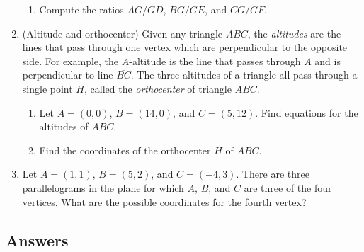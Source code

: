 \begin{enumerate}[resume]
\begin{enumerate}
\item Compute the ratios $AG/GD$, $BG/GE$, and $CG/GF$.
\end{enumerate}
\item (Altitude and orthocenter) Given any triangle $ABC$, the \emph{altitudes} are the lines that pass through one vertex which are perpendicular to the opposite side. For example, the $A$-altitude is the line that passes through $A$ and is perpendicular to line $\overline{BC}$. The three altitudes of a triangle all pass through a single point $H$, called the \emph{orthocenter} of triangle $ABC$.
\begin{enumerate}
\item Let $A = (0,0)$, $B = (14,0)$, and $C = (5,12)$. Find equations for the altitudes of $ABC$.
\item Find the coordinates of the orthocenter $H$ of $ABC$.
\end{enumerate}
\item Let $A = (1,1)$, $B = (5,2)$, and $C = (-4,3)$. There are three parallelograms in the plane for which $A$, $B$, and $C$ are three of the four vertices. What are the possible coordinates for the fourth vertex?
\end{enumerate}

\newpage
\subsection{Answers}

